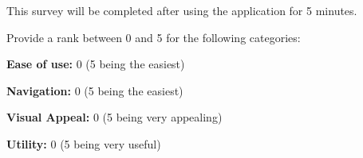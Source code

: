 \documentclass[12pt]{article}
\begin{document}
\begin{tcolorbox}
This survey will be completed after using the application for 5 minutes.

Provide a rank between 0 and 5 for the following categories:

\textbf{Ease of use:} 0 (5 being the easiest)

\textbf{Navigation:} 0 (5 being the easiest)

\textbf{Visual Appeal:} 0 (5 being very appealing)

\textbf{Utility:} 0 (5 being very useful)

\end{tcolorbox}
\end{document}
